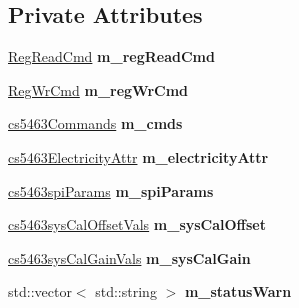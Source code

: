 \subsection*{Private Attributes}
\begin{DoxyCompactItemize}
\item 
\hypertarget{classcs5463spi_a781696b7e209c506e792ad0e20d79a2e}{\hyperlink{structRegReadCmd}{Reg\-Read\-Cmd} {\bfseries m\-\_\-reg\-Read\-Cmd}}\label{classcs5463spi_a781696b7e209c506e792ad0e20d79a2e}

\item 
\hypertarget{classcs5463spi_a61ca58fa6b0046b7fc1ce4d5db0bed4a}{\hyperlink{structRegWrCmd}{Reg\-Wr\-Cmd} {\bfseries m\-\_\-reg\-Wr\-Cmd}}\label{classcs5463spi_a61ca58fa6b0046b7fc1ce4d5db0bed4a}

\item 
\hypertarget{classcs5463spi_a1bcaa5292a33a2dc7a61ff31ba436d0c}{\hyperlink{structcs5463Commands}{cs5463\-Commands} {\bfseries m\-\_\-cmds}}\label{classcs5463spi_a1bcaa5292a33a2dc7a61ff31ba436d0c}

\item 
\hypertarget{classcs5463spi_a47886abba6bf33a5683f56ef9c5ff1cc}{\hyperlink{structcs5463ElectricityAttr}{cs5463\-Electricity\-Attr} {\bfseries m\-\_\-electricity\-Attr}}\label{classcs5463spi_a47886abba6bf33a5683f56ef9c5ff1cc}

\item 
\hypertarget{classcs5463spi_aec97d1e881b52d65cb85b20def733527}{\hyperlink{structcs5463spiParams}{cs5463spi\-Params} {\bfseries m\-\_\-spi\-Params}}\label{classcs5463spi_aec97d1e881b52d65cb85b20def733527}

\item 
\hypertarget{classcs5463spi_af02787a5e4858c19b44215b5b955efa5}{\hyperlink{structcs5463sysCalOffsetVals}{cs5463sys\-Cal\-Offset\-Vals} {\bfseries m\-\_\-sys\-Cal\-Offset}}\label{classcs5463spi_af02787a5e4858c19b44215b5b955efa5}

\item 
\hypertarget{classcs5463spi_a26e1ce56ca06dba3d73c63c8b10a4214}{\hyperlink{structcs5463sysCalGainVals}{cs5463sys\-Cal\-Gain\-Vals} {\bfseries m\-\_\-sys\-Cal\-Gain}}\label{classcs5463spi_a26e1ce56ca06dba3d73c63c8b10a4214}

\item 
\hypertarget{classcs5463spi_a4a13325c4a439e50ebf0276048cf542e}{std\-::vector$<$ std\-::string $>$ {\bfseries m\-\_\-status\-Warn}}\label{classcs5463spi_a4a13325c4a439e50ebf0276048cf542e}

\end{DoxyCompactItemize}
